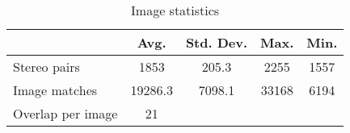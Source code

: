 \begin{table} 
    \label{tab:ImageStats}
    \caption{Image statistics}
    \begin{tabular}{|l|c|c|c|c|}
        \hline              & Avg. & Std. Dev. & Max. & Min. \\
        \hline Stereo pairs & 1853 & 205.3 & 2255 & 1557  \\ 
        Image matches & 19286.3 & 7098.1 & 33168 & 6194  \\ 
        Overlap per image & 21 & & & \\ 
    \end{tabular} 
\end{table}